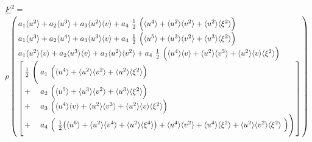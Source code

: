 \documentclass[
	pdftex,             %
	12pt,				%
	a4paper,		   	%
	english,				%
	oneside,			%
]{article}
\newcommand{\mom}[1]{\langle #1 \rangle}
\newcommand{\uu}[1]{\underline{#1}}
\begin{document}
\begin{equation}
\arraycolsep=1.4pt\def\arraystretch{1.5}
\begin{array}{l}
\uu{F}^2 
=
\\
\rho
\left(
\begin{array}{l}
    a_1 \mom{u^2} + 
    a_2 \mom{u^3} +
    a_3 \mom{u^2}\mom{v} +
    a_4 ~\tfrac{1}{2}~\Big( \mom{u^4} + \mom{u^2}\mom{v^2} + \mom{u^2}\mom{\xi^2} \Big)
\\
    a_1 \mom{u^3} +
    a_2 \mom{u^4} +
    a_3 \mom{u^3}\mom{v} +
    a_4 ~\tfrac{1}{2}~\Big( \mom{u^5} + \mom{u^3}\mom{v^2} + \mom{u^3}\mom{\xi^2} \Big)
\\
    a_1 \mom{u^2}\mom{v} +
    a_2 \mom{u^3}\mom{v} +
    a_3 \mom{u^2}\mom{v^2} +
    a_4 ~\tfrac{1}{2}~\Big( \mom{u^4}\mom{v} + \mom{u^2}\mom{v^3} + \mom{u^2}\mom{v}\mom{\xi^2} \Big)
\\
\left[
\begin{array}{ll}
\frac{1}{2} ~ \Bigg( 
   & a_1~ \Big( \mom{u^4} + \mom{u^2}\mom{v^2} + \mom{u^2}\mom{\xi^2} \Big) \\
 + & a_2~ \Big( \mom{u^5} + \mom{u^3}\mom{v^2} + \mom{u^3}\mom{\xi^2} \Big) \\
 + & a_3~ \Big( \mom{u^4}\mom{v} + \mom{u^2}\mom{v^3} + \mom{u^2}\mom{v}\mom{\xi^2} \Big) \\
 + & a_4~ \Big(~ \tfrac{1}{2} \big( \mom{u^6} + \mom{u^2}\mom{v^4} + \mom{u^2}\mom{\xi^4} \big)
 				+ \mom{u^4}\mom{v^2} + \mom{u^4}\mom{\xi^2} + \mom{u^2}\mom{v^2}\mom{\xi^2} ~\Big)
\Bigg)
\end{array}
\right]
\end{array}
\right)
\end{array}
\end{equation}

\end{document}
